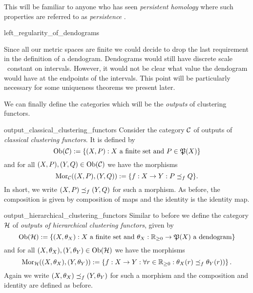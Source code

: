 This will be familiar to anyone who has seen \emph{persistent homology} where such properties are referred to as \emph{persistence} \cite[Chap.~3]{Carlsson2014}. 

\begin{myremark}{}{left_regularity_of_dendograms}

Since all our metric spaces are finite we could decide to drop the last requirement in the definition of a dendogram. Dendograms would still have discrete scale \ie\ constant on intervals.
However, it would not be clear what value the dendogram would have at the endpoints of the intervals.
This point will be particularly necessary for some uniqueness theorems we present later.
\end{myremark}

We can finally define the categories which will be the \emph{outputs} of clustering functors.

\begin{definition}{\cite[Def.~3.2]{Carlsson2010}}{output_classical_clustering_functors}
Consider the category $\mathcal{C}$ of outputs of \emph{classical clustering functors}. It is defined by
\begin{equation*}
    \mathrm {Ob}(\mathcal{C}) := \{(X, P): X \text{ a finite set and } P \in \mathfrak{P}(X)\}
\end{equation*}
and for all $(X,P), (Y,Q) \in \mathrm {Ob}(\mathcal{C})$ we have the morphisms
\begin{equation*}
    \mathrm {Mor}_{\mathcal{C}}((X,P), (Y,Q)) := \{f: X \to Y: P \preceq_f Q\}.
\end{equation*}
In short, we write $(X,P) \preceq_f (Y,Q)$ for such a morphism. As before, the composition is given by composition of maps and the identity is the identity map.
\end{definition}

\begin{definition}{\cite[Def.~3.3]{Carlsson2010}}{output_hierarchical_clustering_functors}
Similar to before we define the category $\mathcal{H}$ of \emph{outputs of hierarchical clustering functors}, given by
\begin{equation*}
    \mathrm {Ob}(\mathcal{H}) := \{(X, \theta_X): X \text{ a finite set and } \theta_X: \mathbb R_{\geq0} \to \mathfrak{P}(X) \ \text{a dendogram}\}
\end{equation*}
and for all $(X, \theta_X), (Y, \theta_Y) \in \mathrm {Ob}(\mathcal{H})$ we have the morphisms
\begin{equation*}
    \mathrm {Mor}_{\mathcal{H}}((X, \theta_X), (Y,\theta_Y)) :=
    \left\{f: X \to Y: \forall r \in \mathbb R_{\geq0}: \theta_X(r) \preceq_f \theta_Y(r)) \right\}.
\end{equation*}
Again we write $(X, \theta_X) \preceq_f (Y, \theta_Y)$ for such a morphism and the composition and identity are defined as before.
\end{definition}

